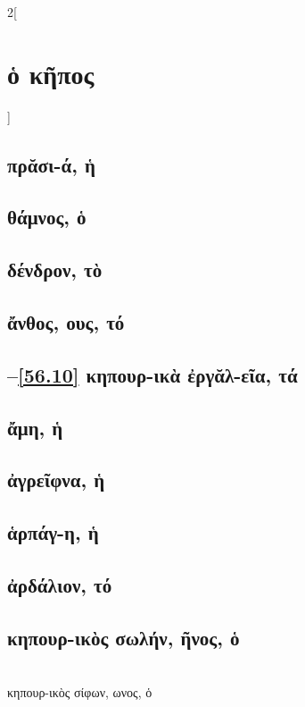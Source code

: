 \documentclass{book}
\begin{document}
\begin{multicols}{2}[\section{ὁ κῆπος}]
{\renewcommand \thesubsection {\thesection} }
\subsection{πρᾰσι-ά, ἡ}
\subsection{θάμνος, ὁ}
\subsection{δένδρον, τὸ}
\subsection{ἄνθος, ους, τό}
\subsection{\protect\hspace{-2ex}--\ref{56.10} κηπουρ-ικὰ ἐργᾰλ-εῖα, τά}
 \setcounter{subsection}{4}
\subsection{ἄμη, ἡ}
\subsection{ἀγρεῖφνα, ἡ}
\subsection{ἁρπάγ-η, ἡ}
\subsection{ἀρδάλιον, τό}
\subsection{κηπουρ-ικὸς σωλήν, ῆνος, ὁ}
 ~\\
κηπουρ-ικὸς σίφων, ωνος, ὁ

\end{multicols}
\end{document}
